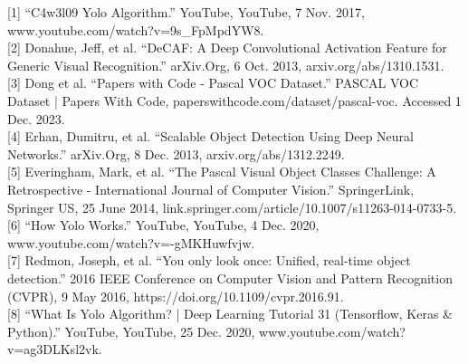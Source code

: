 \documentclass{article}
\begin{document}
{
\small

[1] ``C4w3l09 Yolo Algorithm.'' YouTube, YouTube, 7 Nov. 2017, www.youtube.com/watch?v=9s\_FpMpdYW8. \\

[2] Donahue, Jeff, et al. ``DeCAF: A Deep Convolutional Activation Feature for Generic Visual Recognition.'' arXiv.Org, 6 Oct. 2013, arxiv.org/abs/1310.1531. \\

[3] Dong et al. ``Papers with Code - Pascal VOC Dataset.'' PASCAL VOC Dataset | Papers With Code, paperswithcode.com/dataset/pascal-voc. Accessed 1 Dec. 2023. \\

[4] Erhan, Dumitru, et al. ``Scalable Object Detection Using Deep Neural Networks.'' arXiv.Org, 8 Dec. 2013, arxiv.org/abs/1312.2249. \\

[5] Everingham, Mark, et al. ``The Pascal Visual Object Classes Challenge: A Retrospective - International Journal of Computer Vision.'' SpringerLink, Springer US, 25 June 2014, link.springer.com/article/10.1007/s11263-014-0733-5. \\

[6] ``How Yolo Works.'' YouTube, YouTube, 4 Dec. 2020, www.youtube.com/watch?v=-gMKHuwfvjw. \\

[7] Redmon, Joseph, et al. ``You only look once: Unified, real-time object detection.'' 2016 IEEE Conference on Computer Vision and Pattern Recognition (CVPR), 9 May 2016, https://doi.org/10.1109/cvpr.2016.91. \\

[8] ``What Is Yolo Algorithm? | Deep Learning Tutorial 31 (Tensorflow, Keras \& Python).'' YouTube, YouTube, 25 Dec. 2020, www.youtube.com/watch?v=ag3DLKsl2vk.
}

\end{document}
